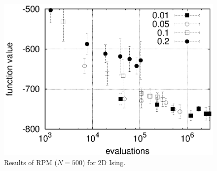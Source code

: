 \begin{figure}[tb]
\centerline{\includegraphics[width=\figlength\linewidth]{data_rpm/rpm_rwor_2d_cutoff.eps}}
\caption{Results of RPM ($N=500$) for 2D Ising.}
\label{result_cutoff}
\end{figure}

